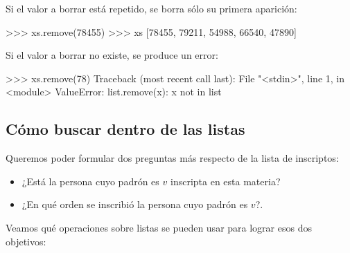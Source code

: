 \begin{itemize}
Si el valor a borrar está repetido, se borra sólo su primera aparición:

\begin{codigo-python-sn}
>>> xs.remove(78455)
>>> xs
[78455, 79211, 54988, 66540, 47890]
\end{codigo-python-sn}

\begin{atencion}
Si el valor a borrar no existe, se produce un error:

\begin{codigo-python-sn}
>>> xs.remove(78)
Traceback (most recent call last):
  File "<stdin>", line 1, in <module>
ValueError: list.remove(x): x not in list
\end{codigo-python-sn}
\end{atencion}
\end{itemize}

\subsection{Cómo buscar dentro de las listas}

Queremos poder formular dos preguntas más respecto de la lista de
inscriptos:

\begin{itemize}
\item ¿Está la persona cuyo padrón es $v$ inscripta en esta materia?

\item ¿En qué orden se inscribió la persona cuyo padrón es $v$?.
\end{itemize}

Veamos qué operaciones sobre listas se pueden usar para lograr esos dos
objetivos:

